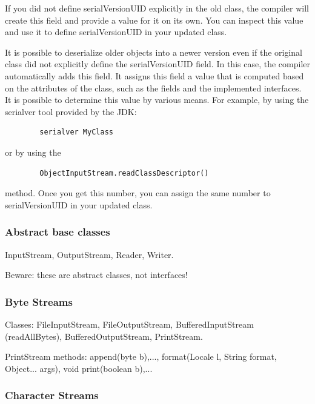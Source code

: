\documentclass{scrartcl}
\begin{document}
    If you did not define serialVersionUID explicitly in the old class, the compiler will create this field and provide a value for it on its own. You can inspect this value and use it to define serialVersionUID in your updated class.

    It is possible to deserialize older objects into a newer version even if the original class did not explicitly define the serialVersionUID field.
    In this case, the compiler automatically adds this field. It assigns this field a value that is computed based on the attributes of the class, such as the fields and the implemented interfaces.  It is possible to determine this value by various means. For example, by using the serialver tool provided by the JDK:

    \begin{lstlisting}
        serialver MyClass
    \end{lstlisting}

     or by using the

     \begin{lstlisting}
        ObjectInputStream.readClassDescriptor()
     \end{lstlisting}

      method.  Once you get this number, you can assign the same number to serialVersionUID in your updated class.

\subsubsection{Abstract base classes}

    InputStream, OutputStream, Reader, Writer.

    Beware: these are abstract classes, not interfaces!

\subsubsection{Byte Streams}

    Classes: FileInputStream, FileOutputStream, BufferedInputStream (readAllBytes), BufferedOutputStream, PrintStream.

    PrintStream methods: append(byte b),..., format(Locale l, String format, Object... args), void print(boolean b),...

\subsubsection{Character Streams}
\end{document}

